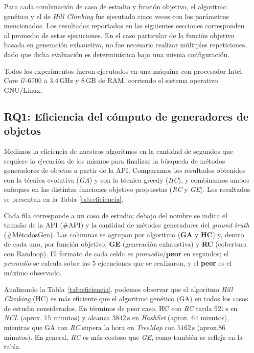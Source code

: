 Para cada combinación de caso de estudio y función objetivo, el algoritmo
genético y el de \emph{Hill Climbing} fue ejecutado cinco veces con los parámetros mencionados. Los
resultados reportados en las siguientes secciones corresponden al promedio de
estas ejecuciones. En el caso particular de la función objetivo basada en
generación exhaustiva, no fue necesario realizar múltiples repeticiones, dado
que dicha evaluación es determinística bajo una misma configuración.

Todos los experimentos fueron ejecutados en una máquina con procesador Intel
Core i7-6700 a 3.4\,GHz y 8\,GB de RAM, corriendo el sistema operativo
GNU/Linux.

\subsection{RQ1: Eficiencia del cómputo de generadores de objetos}

Medimos la eficiencia de nuestros algoritmos en la cantidad de segundos que
requiere la ejecución de los mismos para finalizar la búsqueda de métodos
generadores de objetos a partir de la API. 
Comparamos los resultados obtenidos con la técnica evolutiva (\emph{GA}) y con
la técnica greedy (\emph{HC}), y combinamos ambos enfoques en las distintas
funciones objetivo propuestas (\emph{RC} y \emph{GE}). Los resultados se presentan en la Tabla \ref{tab:eficiencia}.


Cada fila corresponde a un caso de estudio; debajo del nombre se indica el tamaño de la API (\#API) y 
la cantidad de métodos generadores del \emph{ground truth} (\#MétodosGen). 
Las columnas se agrupan por algoritmo (\textbf{GA} y \textbf{HC}) y, dentro de cada uno, por función 
objetivo, \textbf{GE} (generación exhaustiva) y \textbf{RC} (cobertura con Randoop). 
El formato de cada celda es \emph{promedio}/\textbf{peor} en segundos; 
el \emph{promedio} se calcula sobre las 5 ejecuciones que se realizaron, y el \textbf{peor} es el máximo observado. 

Analizando la Tabla~\ref{tab:eficiencia}, podemos observar que el algoritmo \emph{Hill Climbing} (HC) es
más eficiente que el algoritmo genético (GA) en todos los casos de estudio considerados.
En términos de peor caso, HC con \emph{RC} tarda \(921\,\text{s}\) en \emph{NCL} (aprox. 15 minutos) y
alcanza \(3842\,\text{s}\) en \emph{HashSet} (aprox. 64 minutos), mientras que GA con \emph{RC} supera la hora
en \emph{TreeMap} con \(5162\,\text{s}\) (aprox.86 minutos). En general, \emph{RC} es más costoso que \emph{GE},
como también se refleja en la tabla.

